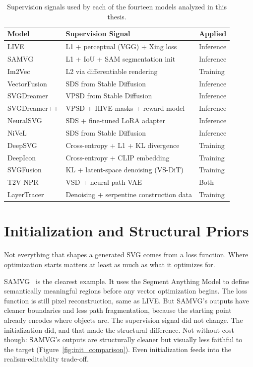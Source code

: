 \begin{table}[ht]
\centering
\caption{Supervision signals used by each of the fourteen models 
analyzed in this thesis.}
\label{tab:supervision_overview}
\begin{tabular}{l l l}
\hline
\textbf{Model} & \textbf{Supervision Signal} & \textbf{Applied} \\
\hline
LIVE & L1 + perceptual (VGG) + Xing loss & Inference \\
SAMVG & L1 + IoU + SAM segmentation init & Inference \\
Im2Vec & L2 via differentiable rendering & Training \\
VectorFusion & SDS from Stable Diffusion & Inference \\
SVGDreamer & VPSD from Stable Diffusion & Inference \\
SVGDreamer++ & VPSD + HIVE masks + reward model & Inference \\
NeuralSVG & SDS + fine-tuned LoRA adapter & Inference \\
NiVeL & SDS from Stable Diffusion & Inference \\
DeepSVG & Cross-entropy + L1 + KL divergence & Training \\
DeepIcon & Cross-entropy + CLIP embedding & Training \\
SVGFusion & KL + latent-space denoising (VS-DiT) & Training \\
T2V-NPR & VSD + neural path VAE & Both \\
LayerTracer & Denoising + serpentine construction data & Training \\
\hline
\end{tabular}
\end{table}


\section{Initialization and Structural Priors}
\label{sec:init_priors}

Not everything that shapes a generated SVG comes from a loss function. Where optimization starts matters at least as much as what it optimizes for.

SAMVG~\cite{zhuSAMVGMultistageImage2023} is the clearest example. It uses the Segment Anything Model to define semantically meaningful regions before any vector optimization begins. The loss function is still pixel reconstruction, same as LIVE. But SAMVG's outputs have cleaner boundaries and less path fragmentation, because the starting point already encodes where objects are. The supervision signal did not change. The initialization did, and that made the structural difference. Not without cost though: SAMVG's outputs are structurally cleaner but visually less faithful to the target (Figure~\ref{fig:init_comparison}). Even initialization feeds into the realism-editability trade-off.

